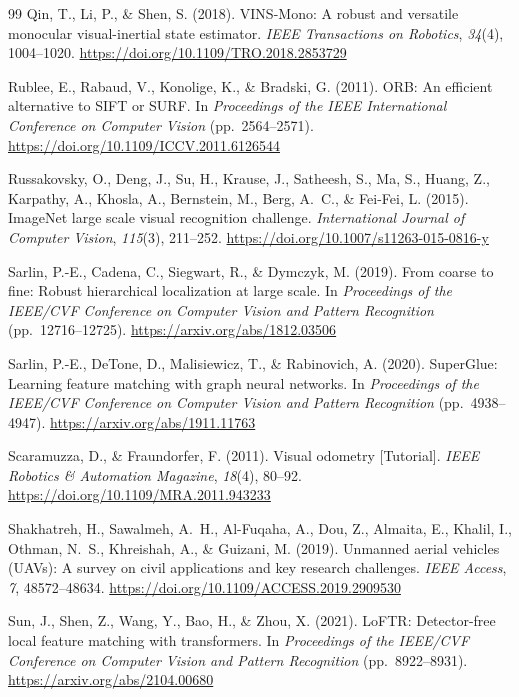 \documentclass[english, Lau, oneside]{sapthesis}%
\begin{document}
\begin{thebibliography}{99}
Qin, T., Li, P., \& Shen, S. (2018).
VINS-Mono: A robust and versatile monocular visual-inertial state estimator.
\textit{IEEE Transactions on Robotics}, \textit{34}(4), 1004--1020. \url{https://doi.org/10.1109/TRO.2018.2853729}

Rublee, E., Rabaud, V., Konolige, K., \& Bradski, G. (2011).
ORB: An efficient alternative to SIFT or SURF.
In \textit{Proceedings of the IEEE International Conference on Computer Vision} (pp.~2564--2571). \url{https://doi.org/10.1109/ICCV.2011.6126544}

Russakovsky, O., Deng, J., Su, H., Krause, J., Satheesh, S., Ma, S., Huang, Z., Karpathy, A., Khosla, A., Bernstein, M., Berg, A.~C., \& Fei-Fei, L. (2015).
ImageNet large scale visual recognition challenge.
\textit{International Journal of Computer Vision}, \textit{115}(3), 211--252. \url{https://doi.org/10.1007/s11263-015-0816-y}

Sarlin, P.-E., Cadena, C., Siegwart, R., \& Dymczyk, M. (2019).
From coarse to fine: Robust hierarchical localization at large scale.
In \textit{Proceedings of the IEEE/CVF Conference on Computer Vision and Pattern Recognition} (pp.~12716--12725). \url{https://arxiv.org/abs/1812.03506}

Sarlin, P.-E., DeTone, D., Malisiewicz, T., \& Rabinovich, A. (2020).
SuperGlue: Learning feature matching with graph neural networks.
In \textit{Proceedings of the IEEE/CVF Conference on Computer Vision and Pattern Recognition} (pp.~4938--4947). \url{https://arxiv.org/abs/1911.11763}

Scaramuzza, D., \& Fraundorfer, F. (2011).
Visual odometry [Tutorial].
\textit{IEEE Robotics \& Automation Magazine}, \textit{18}(4), 80--92. \url{https://doi.org/10.1109/MRA.2011.943233}

Shakhatreh, H., Sawalmeh, A.~H., Al-Fuqaha, A., Dou, Z., Almaita, E., Khalil, I., Othman, N.~S., Khreishah, A., \& Guizani, M. (2019).
Unmanned aerial vehicles (UAVs): A survey on civil applications and key research challenges.
\textit{IEEE Access}, \textit{7}, 48572--48634. \url{https://doi.org/10.1109/ACCESS.2019.2909530}

Sun, J., Shen, Z., Wang, Y., Bao, H., \& Zhou, X. (2021).
LoFTR: Detector-free local feature matching with transformers.
In \textit{Proceedings of the IEEE/CVF Conference on Computer Vision and Pattern Recognition} (pp.~8922--8931). \url{https://arxiv.org/abs/2104.00680}


\end{thebibliography}
\end{document}
